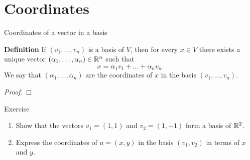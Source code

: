 \documentclass{beamer}
\begin{document}
\section{Coordinates}
\begin{frame}[t]{Coordinates of a vector in a basis}
	\vspace{-0.4cm}
	\begin{block}{\bf Definition}
		If $(v_1, \dots, v_n)$ is a basis of $V$, then for every $x \in V$ there exists a unique vector $(\alpha_1, \dots, \alpha_n) \in \mathbb{R}^n$ such that
		$$
		x = \alpha_1 v_1 + \dots + \alpha_n v_n.
		$$
		We say that $(\alpha_1, \dots, \alpha_n)$ are the coordinates of $x$ in the basis $(v_1, \dots, v_n)$.
	\end{block}
	\pause
	\begin{proof}
		\vspace{2.5cm}
		\vfill
	\end{proof}
\end{frame}

\begin{frame}[t]{Exercise}
	\vspace{-0.8cm}
	\begin{exampleblock}{}
		\begin{enumerate}
			\item Show that the vectors $v_1 = (1,1)$ and $v_2=(1,-1)$ form a basis of $\mathbb{R}^2$.
			\item Express the coordinates of $u=(x,y)$ in the basis $(v_1,v_2)$ in terms of $x$ and $y$.
		\end{enumerate}
	\end{exampleblock}
	\pause
\end{frame}
\end{document}
